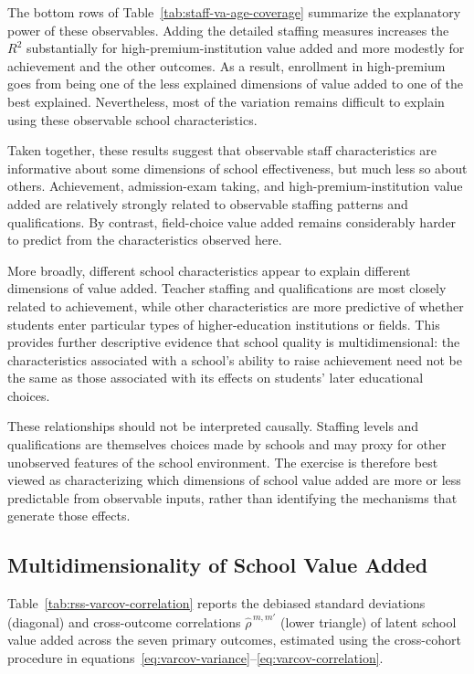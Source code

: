 \documentclass[a4paper, article, english, oneside, unknownkeysallowed, 12pt]{memoir}
\begin{document}
The bottom rows of Table~\ref{tab:staff-va-age-coverage} summarize the explanatory power of these observables. 
Adding the detailed staffing measures increases the $R^2$ substantially for high-premium-institution value added and more modestly for achievement and the other outcomes. 
As a result, enrollment in high-premium goes from being one of the less explained dimensions of value added to one of the best explained.
Nevertheless, most of the variation remains difficult to explain using these observable school characteristics. 


Taken together, these results suggest that observable staff characteristics are informative about some dimensions of school effectiveness, but much less so about others. 
Achievement, admission-exam taking, and high-premium-institution value added are relatively strongly related to observable staffing patterns and qualifications.
By contrast, field-choice value added remains considerably harder to predict from the characteristics observed here.

More broadly, different school characteristics appear to explain different dimensions of value added. 
Teacher staffing and qualifications are most closely related to achievement, while other characteristics are more predictive of whether students enter particular types of higher-education institutions or fields.
This provides further descriptive evidence that school quality is multidimensional: 
the characteristics associated with a school's ability to raise achievement need not be the same as those associated with its effects on students' later educational choices.

These relationships should not be interpreted causally. 
Staffing levels and qualifications are themselves choices made by schools and may proxy for other unobserved features of the school environment. 
The exercise is therefore best viewed as characterizing which dimensions of school value added are more or less predictable from observable inputs,
rather than identifying the mechanisms that generate those effects.

\subsection{Multidimensionality of School Value Added}

Table~\ref{tab:rss-varcov-correlation} reports the debiased standard deviations (diagonal)
and cross-outcome correlations $\widehat\rho^{\,m,m'}$ (lower triangle) of latent school
value added across the seven primary outcomes, estimated using the cross-cohort procedure
in equations~\eqref{eq:varcov-variance}--\eqref{eq:varcov-correlation}.
\end{document}
